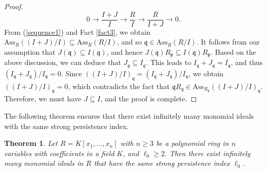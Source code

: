 \documentclass[11pt]{amsart}
\newtheorem{theorem}{Theorem}[section]
\begin{document}
\begin{proof}
 \begin{equation}\label{sequence1}
0\longrightarrow \frac{I+J}{I} \longrightarrow  \frac{R}{I}  \longrightarrow \frac{R}{I+J} \longrightarrow  0.
\end{equation} 
From  (\ref{sequence1}) and Fact \ref{fact3}, we obtain $\mathrm{Ass}_R((I+J)/I) \subseteq \mathrm{Ass}_R(R/I)$, and so  $\mathfrak{q}\in \mathrm{Ass}_R(R/I)$. 
It follows  from our assumption that $J(\mathfrak{q})\subseteq I(\mathfrak{q})$, and hence  $J(\mathfrak{q})R_{\mathfrak{p}}\subseteq I(\mathfrak{q})R_{\mathfrak{p}}$. Based on the 
 above discussion, we can deduce that   $J_{\mathfrak{q}}  \subseteq I_{\mathfrak{q}}$.
  This leads to $I_{\mathfrak{q}} + J_{\mathfrak{q}}=  I_{\mathfrak{q}}$, and thus $(I_{\mathfrak{q}} + J_{\mathfrak{q}})/ I_{\mathfrak{q}}=0$.  
    Since $((I+J)/I)_{\mathfrak{q}}=(I_{\mathfrak{q}} + J_{\mathfrak{q}})/ I_{\mathfrak{q}}$, we obtain  $((I+J)/I)_{\mathfrak{q}}=0$, which 
    contradicts the fact that  $\mathfrak{q}R_{\mathfrak{q}}\in \mathrm{Ass}_{R_{\mathfrak{q}}}((I+J)/I)_{\mathfrak{q}}$. Therefore, we must have $J\subseteq I$, and the proof is complete.  
 \end{proof}
 



The following theorem  ensures that there exist infinitely many  monomial ideals  with the same strong persistence index.  



\begin{theorem} \label{Th.SPP.Index}
Let $R=K[x_1, \ldots, x_n]$ with $n\geq 3$ be  a polynomial ring in $n$  variables  with coefficients in a  field $K$, and $\ell_{0}\geq 2$. 
Then there exist infinitely many  monomial ideals  in $R$  that  have  the  same strong persistence index $\ell_0$. 
\end{theorem}
\end{document}
